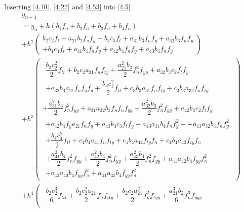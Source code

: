 \documentclass[a4paper,oneside]{book}
\numberwithin{equation}{chapter}
\begin{document}
Inserting \eqref{4.10}, \eqref{4.27} and \eqref{4.53} into \eqref{4.5}
\begin{align}
&{{y_{n + 1}}}\\
 &= {{y_n}} + h\left( {{b_1}{f_n} + {b_2}{f_n} + {b_3}{f_n} + {b_4}{f_n}} \right)\\
 &+ {h^2}\left( {\begin{array}{*{20}{l}}
{{b_2}{c_2}{f_t} + {a_{21}}{b_2}{f_n}{f_y} + {b_3}{c_3}{f_t} + {a_{31}}{b_3}{f_n}{f_y} + {a_{32}}{b_3}{f_n}{f_y}}\\
{ + {b_4}{c_4}{f_t} + {a_{41}}{b_4}{f_n}{f_y} + {a_{42}}{b_4}{f_n}{f_y} + {a_{43}}{b_4}{f_n}{f_y}}
\end{array}} \right)\\
& + {h^3}\left( {\begin{array}{*{20}{l}}
\begin{array}{l}
\dfrac{{{b_2}c_2^2}}{2}{f_{tt}} + {b_2}{c_2}{a_{21}}{f_n}{f_{ty}} + \dfrac{{a_{21}^2{b_2}}}{2}f_n^2{f_{yy}} + {a_{32}}{b_3}{c_2}{f_t}{f_y}\\
 + {a_{32}}{b_3}{a_{21}}{f_n}{f_y}{f_y} + \dfrac{{{b_3}c_3^2}}{2}{f_{tt}} + {c_3}{b_3}{a_{31}}{f_n}{f_{ty}} + {c_3}{b_3}{a_{32}}{f_n}{f_{ty}}
\end{array}\\
{ + \dfrac{{a_{31}^2{b_3}}}{2}f_n^2{f_{yy}} + {a_{31}}{a_{32}}{b_3}{f_n}{f_n}{f_{yy}} + \dfrac{{a_{32}^2{b_3}}}{2}f_n^2{f_{yy}} + {a_{42}}{b_4}{c_2}{f_t}{f_y}}\\
\begin{array}{l}
 + {a_{42}}{b_4}{f_y}{a_{21}}{f_n}{f_y} + {a_{43}}{b_4}{c_3}{f_t}{f_y} + {a_{43}}{a_{31}}{b_4}{f_n}f_y^2 +  + {a_{43}}{a_{32}}{b_4}{f_n}f_y^2\\
 + \dfrac{{{b_4}c_4^2}}{2}{f_{tt}} + {c_4}{b_4}{a_{41}}{f_n}{f_{ty}} + {c_4}{b_4}{a_{42}}{f_{ty}}{f_n} + {c_4}{b_4}{a_{43}}{f_{ty}}{f_n}\\
 + \dfrac{{a_{41}^2{b_4}}}{2}f_n^2{f_{yy}} + \dfrac{{a_{42}^2{b_4}}}{2}f_n^2{f_{yy}} + \dfrac{{a_{43}^2{b_4}}}{2}f_n^2{f_{yy}} + {a_{41}}{a_{42}}{b_4}{f_{yy}}f_n^2\\
 + {a_{42}}{a_{43}}{b_4}{f_{yy}}f_n^2 + {a_{41}}{a_{43}}{b_4}{f_{yy}}f_n^2
\end{array}
\end{array}} \right)\\
 &+ {h^4}\left( {\begin{array}{*{20}{l}}
\begin{array}{l}
\dfrac{{{b_2}c_2^3}}{6}{f_{ttt}} + \dfrac{{{b_2}c_2^2{a_{21}}}}{2}{f_n}{f_{tty}} + \dfrac{{{b_2}{c_2}a_{21}^2}}{2}f_n^2{f_{tyy}} + \dfrac{{a_{21}^3{b_2}}}{6}f_n^3{f_{yyy}}\\

\end{array}
\end{array}}
\end{align}
\end{document}
